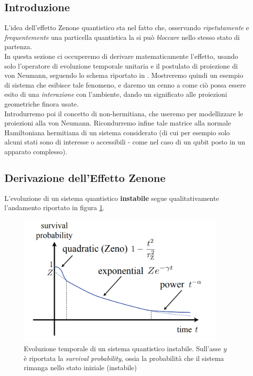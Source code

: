 \documentclass[../../InformazioneQuantistica.tex]{subfiles}
\begin{document}
\subsection{Introduzione}
L'idea dell'effetto Zenone quantistico sta nel fatto che, osservando \textit{ripetutamente} e \textit{frequentemente} una particella quantistica la si può \textit{bloccare} nello stesso stato di partenza.\\

In questa sezione  ci occuperemo di derivare matematicamente l'effetto, usando solo l'operatore di evoluzione temporale unitaria e il postulato di proiezione di von Neumann, seguendo lo schema riportato in \cite{zeno}. Mostreremo quindi un esempio di sistema che esibisce tale fenomeno, e daremo un cenno a come ciò possa essere esito di una \textit{interazione} con l'ambiente, dando un significato  alle proiezioni geometriche finora usate.\\
Introdurremo poi il concetto di  non-hermitiana, che useremo per modellizzare le proiezioni alla von Neumann. Ricondurremo infine tale matrice alla normale Hamiltoniana hermitiana di un sistema considerato  (di cui per esempio solo alcuni stati sono di interesse o accessibili - come nel caso di un qubit posto in un apparato complesso).

\subsection{Derivazione dell'Effetto Zenone}
L'evoluzione di un sistema quantistico \textbf{instabile} segue qualitativamente l'andamento riportato in figura \ref{fig:evoluzione-decadimento}.

\begin{figure}[H]
\centering
\includegraphics[width=10.5cm]{Immagini/7_3/image002.png}
\caption{Evoluzione temporale di un sistema quantistico instabile. Sull'asse $y$ è riportata la \textit{survival probability}, ossia la probabilità che il sistema rimanga nello stato iniziale (instabile)\label{fig:evoluzione-decadimento}}
\end{figure}
\end{document}
